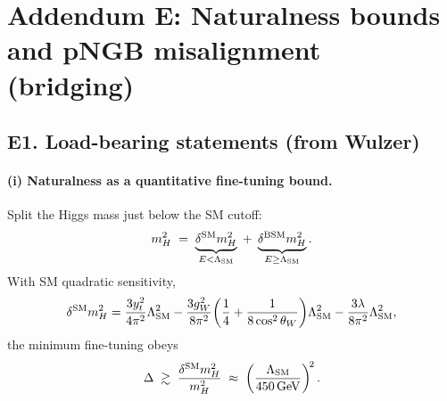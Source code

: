\documentclass[11pt]{article}
\begin{document}
  \titlepageOpen

  \begin{abstract}


  \end{abstract}

  \titlepageClose
  \fi

  \ifdefined\standalonechapter
  \section{\papertitle}
  \else
  \fi



  \section*{Addendum E: Naturalness bounds and pNGB misalignment (bridging)}

      \subsection*{E1. Load-bearing statements (from Wulzer)}
          \paragraph{(i) Naturalness as a quantitative fine-tuning bound.}
              Split the Higgs mass just below the SM cutoff:
              \begin{equation}\label{eq:E_split}
          m_H^2 \;=\; \underbrace{\delta^{\rm SM} m_H^2}_{E<\Lambda_{\rm SM}}
          \;+\; \underbrace{\delta^{\rm BSM} m_H^2}_{E\ge \Lambda_{\rm SM}} .
              \end{equation}
              With SM quadratic sensitivity,
              \begin{equation}\label{eq:E_quad}
          \delta^{\rm SM} m_H^2
          =\frac{3y_t^2}{4\pi^2}\Lambda_{\rm SM}^2
          -\frac{3g_W^2}{8\pi^2}\!\left(\frac14+\frac{1}{8\cos^2\theta_W}\right)\!\Lambda_{\rm SM}^2
          -\frac{3\lambda}{8\pi^2}\Lambda_{\rm SM}^2,
              \end{equation}
              the minimum fine-tuning obeys
              \begin{equation}\label{eq:E_tuning}
          \Delta \;\gtrsim\; \frac{\delta^{\rm SM} m_H^2}{m_H^2}
          \;\approx\; \left(\frac{\Lambda_{\rm SM}}{450\,{\rm GeV}}\right)^{\!2}.
              \end{equation}
\end{document}

